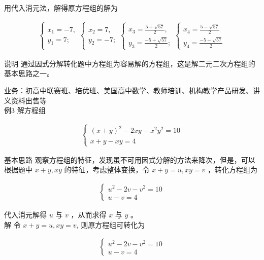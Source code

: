 \documentclass[10pt]{article}
\begin{document}
用代入消元法，解得原方程组的解为

\begin{align*}
\left\{\begin{array} { l } 
{ x _ { 1 } = - 7 , } \\
{ y _ { 1 } = 7 ; }
\end{array} \left\{\begin{array} { l } 
{ x _ { 2 } = 7 , } \\
{ y _ { 2 } = - 7 ; }
\end{array} \left\{\begin{array} { l } 
{ x _ { 3 } = \frac { 5 + \sqrt { 5 7 } } { 2 } , } \\
{ y _ { 3 } = \frac { - 5 + \sqrt { 5 7 } } { 2 } ; }
\end{array} \left\{\begin{array}{l}
x_{4}=\frac{5-\sqrt{57}}{2} \\
y_{4}=\frac{-5-\sqrt{57}}{2}
\end{array}\right.\right.\right.\right.
\end{align*}

说明 通过因式分解转化题中方程组为容易解的方程组，这是解二元二次方程组的基本思路之一。

业务：初高中联赛班、培优班、美国高中数学、教师培训、机构教学产品研发、讲义资料出售等\\
例3 解方程组

\begin{align*}
\left\{\begin{array}{l}
(x+y)^{2}-2 x y-x^{2} y^{2}=10 \\
x+y-x y=4
\end{array}\right.
\end{align*}

基本思路 观察方程组的特征，发现虽不可用因式分解的方法来降次，但是，可以根据题中 $x+y, x y$ 的特征，考虑整体变换，令 $x+y=u, x y=v$ ，转化方程组为

\begin{align*}
\left\{\begin{array}{l}
u^{2}-2 v-v^{2}=10 \\
u-v=4
\end{array}\right.
\end{align*}

代入消元解得 $u$ 与 $v$ ，从而求得 $x$ 与 $y$ 。\\
解 令 $x+y=u, x y=v$, 则原方程组可转化为

\begin{align*}
\left\{\begin{array}{l}
u^{2}-2 v-v^{2}=10 \\
u-v=4
\end{array}\right.
\end{align*}
\end{document}

